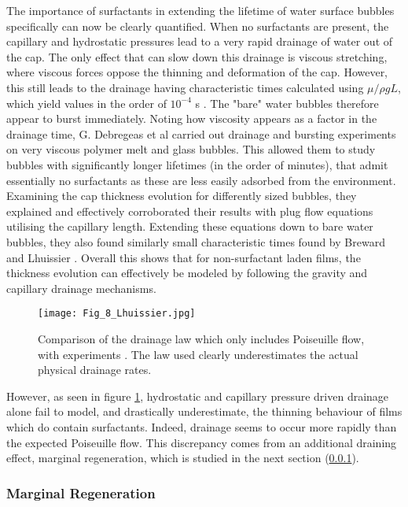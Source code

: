 \documentclass[a4paper,12pt]{article}
\numberwithin{equation}{section}
\numberwithin{figure}{section}
\numberwithin{table}{section}
\begin{document}
The importance of surfactants in extending the lifetime of water surface bubbles specifically can now be clearly quantified. When no surfactants are present, the capillary and hydrostatic pressures lead to a very rapid drainage of water out of the cap. The only effect that can slow down this drainage is viscous stretching, where viscous forces oppose the thinning and deformation of the cap. However, this still leads to the drainage having characteristic times calculated using $\mu / \rho g L$, which yield values in the order of $10^{-4}$ s \cite{Breward2002, Lhuissier2011}. The "bare" water bubbles therefore appear to burst immediately. Noting how viscosity appears as a factor in the drainage time, G. Debregeas et al \cite{Debregeas1998} carried out drainage and bursting experiments on very viscous polymer melt and glass bubbles. This allowed them to study bubbles with significantly longer lifetimes (in the order of minutes), that admit essentially no surfactants as these are less easily adsorbed from the environment. Examining the cap thickness evolution for differently sized bubbles, they explained and effectively corroborated their results with plug flow equations utilising the capillary length. Extending these equations down to bare water bubbles, they also found similarly small characteristic times found by Breward and Lhuissier \cite{Breward2002, Lhuissier2011}. Overall this shows that for non-surfactant laden films, the thickness evolution can effectively be modeled by following the gravity and capillary drainage mechanisms.

\begin{figure}[!htbp]
    \centering
    \captionsetup{width=.9\linewidth}
    \texttt{[image: Fig\_8\_Lhuissier.jpg]}
    \caption{Comparison of the drainage law which only includes Poiseuille flow, with experiments \cite{Lhuissier2011}. The law used clearly underestimates the actual physical drainage rates.}
    \label{fig:Lhuissier8}
\end{figure}

However, as seen in figure \ref{fig:Lhuissier8}, hydrostatic and capillary pressure driven drainage alone fail to model, and drastically underestimate, the thinning behaviour of films which do contain surfactants. Indeed, drainage seems to occur more rapidly than the expected Poiseuille flow. This discrepancy comes from an additional draining effect, marginal regeneration, which is studied in the next section (\ref{sec:marginalReg}).

\subsubsection{Marginal Regeneration}
\label{sec:marginalReg}
\end{document}
